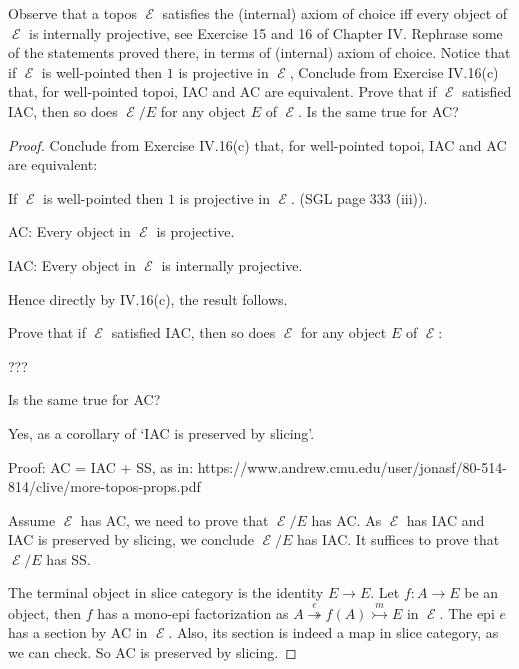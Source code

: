 \documentclass[a4paper]{article}
\title{\hmwkTitle}
\author{\textbf{\hmwkAuthorName}}
\date{\hmwkDueDate}
\DeclareMathOperator{\E}{\mathcal E}
\begin{document}
\begin{titlepage}
    \maketitle
\end{titlepage}
\begin{question}
    Observe that a topos $\E$ satisfies the (internal) axiom of choice iff every object of $\E$ is internally projective, see Exercise 15 and 16 of Chapter IV. Rephrase some of the statements proved there, in terms of (internal) axiom of choice. Notice that if $\E$ is well-pointed then $1$ is projective in $\E$, Conclude from Exercise IV.16(c) that, for well-pointed topoi, IAC and AC are equivalent. Prove that if $\E$ satisfied IAC, then so does $\E/E$ for any object $E$ of $\E$. Is the same true for AC?
\end{question}
\begin{proof}

    Conclude from Exercise IV.16(c) that, for well-pointed topoi, IAC and AC are equivalent:

    If $\E$ is well-pointed then $1$ is projective in $\E$. (SGL page 333 (iii)).

    AC: Every object in $\E$ is projective.

    IAC: Every object in $\E$ is internally projective.

    Hence directly by IV.16(c), the result follows.

    Prove that if $\E$ satisfied IAC, then so does $\E$ for any object $E$ of $\E$:

    ???

    Is the same true for AC?

    Yes, as a corollary of `IAC is preserved by slicing'.

    Proof: AC = IAC + SS, as in:
    https://www.andrew.cmu.edu/user/jonasf/80-514-814/clive/more-topos-props.pdf

    Assume $\E$ has AC, we need to prove that $\E/E$ has AC. As $\E$ has IAC and IAC is preserved by slicing, we conclude $\E/E$ has IAC. It suffices to prove that $\E/E$ has SS. 

    The terminal object in slice category is the identity $E\to E$. Let $f:A\to E$ be an object, then $f$ has a mono-epi factorization as $A\overset{e}\twoheadrightarrow f(A)\overset{m}\rightarrowtail E$ in $\E$. The epi $e$ has a section by AC in $\E$. Also, its section is indeed a map in slice category, as we can check. So AC is preserved by slicing.




\end{proof}
\end{document}
